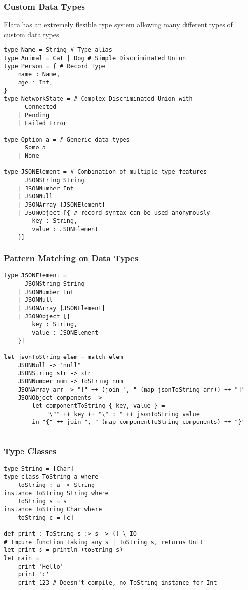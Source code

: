 \documentclass{report}
\begin{document}
\subsubsection{Custom Data Types}
Elara has an extremely flexible type system allowing many different types of custom data types
\begin{verbatim}
type Name = String # Type alias
type Animal = Cat | Dog # Simple Discriminated Union
type Person = { # Record Type
    name : Name,
    age : Int,
}
type NetworkState = # Complex Discriminated Union with
      Connected
    | Pending
    | Failed Error

type Option a = # Generic data types
      Some a
    | None

type JSONElement = # Combination of multiple type features
      JSONString String
    | JSONNumber Int
    | JSONNull
    | JSONArray [JSONElement]
    | JSONObject [{ # record syntax can be used anonymously
        key : String,
        value : JSONElement
    }] 
\end{verbatim}

\subsubsection{Pattern Matching on Data Types}
\begin{verbatim}
type JSONElement =
      JSONString String
    | JSONNumber Int
    | JSONNull
    | JSONArray [JSONElement]
    | JSONObject [{
        key : String,
        value : JSONElement
    }]

let jsonToString elem = match elem
    JSONNull -> "null"
    JSONString str -> str
    JSONNumber num -> toString num
    JSONArray arr -> "[" ++ (join ", " (map jsonToString arr)) ++ "]"
    JSONObject components -> 
        let componentToString { key, value } = 
            "\"" ++ key ++ "\" : " ++ jsonToString value
        in "{" ++ join ", " (map componentToString components) ++ "}"
    
\end{verbatim}

\subsubsection{Type Classes}
\begin{verbatim}
type String = [Char]
type class ToString a where
    toString : a -> String
instance ToString String where
    toString s = s
instance ToString Char where
    toString c = [c]

def print : ToString s :> s -> () \ IO
# Impure function taking any s | ToString s, returns Unit
let print s = println (toString s)
let main = 
    print "Hello"
    print 'c'
    print 123 # Doesn't compile, no ToString instance for Int
\end{verbatim}
\end{document}

